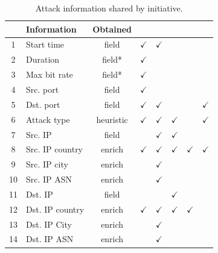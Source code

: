 \documentclass{llncs}
\begin{document}
\begin{table}[h!] \small \center \caption{Attack information shared by
initiative.}
\label{tab:attack_fields} \begin{tabular}{|c| l | c |c|c|c|c|c|} \hline
&\textbf{Information}      & \textbf{Obtained}&\cite{digitalattackmap2013web} &
\cite{norse2015web}& \cite{ipew2015web}  & \cite{fireeye2015web} &
\cite{kaspersky2015web2}\\ \hline

1&Start time 	&field&  $\checkmark$	& $\checkmark$	& ~
& ~ & ~    \\ \hline    
2&Duration 		&field*& $\checkmark$	& ~ & ~
& ~ & ~   \\ \hline 
3&Max bit rate	&field*& $\checkmark$	& ~ & ~ & ~ & ~
\\ \hline 
4&Src.  port 		&field& $\checkmark$	& ~ & ~ & ~ & ~   \\\hline 
5&Dst.  port &field& $\checkmark$	& $\checkmark$	& ~ & ~ & $\checkmark$
\\ \hline 
6&Attack type&heuristic& $\checkmark$ & $\checkmark$	&
$\checkmark$ &~ & $\checkmark$    \\ \hline \hline\hline 
7&Src.  IP &field& ~ &
$\checkmark$ & $\checkmark$& ~ & ~    \\ \hline 
8&Src. IP country	&enrich&
$\checkmark$ & $\checkmark$ & $\checkmark$& $\checkmark$ & $\checkmark$   \\
\hline    
9&Src.  IP city &enrich& ~ & $\checkmark$	& ~ & ~ & ~   \\  \hline
10&Src. IP ASN &enrich& ~ & $\checkmark$	& ~ & ~ & ~ \\ \hline \hline\hline
\rowcolor{red}11&Dst.  IP &field& ~ & ~ & $\checkmark$& ~ & ~ \\\hline
12&Dst. IP country&enrich& $\checkmark$ & $\checkmark$	& $\checkmark$& $\checkmark$ & ~
\\ \hline \rowcolor{red}13&Dst. IP City &enrich& ~ & $\checkmark$	& ~ & ~ & ~   \\
\hline \rowcolor{red}14&Dst. IP ASN &enrich& ~ & $\checkmark$ & ~ & ~ & ~ \\ \hline
\end{tabular} \end{table}
\end{document}

